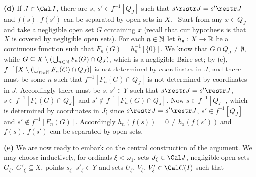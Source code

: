 {{\bf (d)} If $J\in\Cal J$, there are $s$, $s'\in f^{-1}[Q_J]$ such that
$s\restr J=s'\restr J$ and $f(s)$, $f(s')$ can be separated by open sets
in $X$.   \Prf\ Start from any $x\in Q_J$ and take a negligible
open set $G$ containing $x$ (recall that our hypothesis is that $X$ is
covered by negligible open sets).   For each $n\in\Bbb N$ let
$h_n:X\to\Bbb R$ be a continuous function such that
$F_n(G)=h_n^{-1}[\{0\}]$.   We know that $G\cap Q_J\ne\emptyset$, while
$G\subseteq X\setminus(\bigcup_{n\in\Bbb N}F_n(G)\cap Q_J)$, which is a
negligible Baire set;  by (c), $f^{-1}[X\setminus(\bigcup_{n\in\Bbb
N}F_n(G)\cap Q_J)]$ is not determined by coordinates in $J$, and there
must be some $n$ such that $f^{-1}[F_n(G)\cap Q_J]$ is not determined by
coordinates in $J$.   Accordingly
there must be $s$, $s'\in Y$ such that $s\restr J=s'\restr J$, $s\in
f^{-1}[F_n(G)\cap Q_J]$ and $s'\notin f^{-1}[F_n(G)\cap Q_J]$.   Now
$s\in f^{-1}[Q_J]$, which is determined by coordinates in $J$;  since
$s\restr J=s'\restr J$, $s'\in f^{-1}[Q_J]$ and
$s'\notin f^{-1}[F_n(G)]$.
Accordingly $h_n(f(s))=0\ne h_n(f(s'))$ and $f(s)$, $f(s')$ can be
separated by open sets.\ \Qed

\medskip

{\bf (e)} We are now ready to embark on the central construction of the
argument.   We may choose inductively, for ordinals $\xi<\omega_1$, sets
$J_{\xi}\in\Cal J$, negligible open sets $G_{\xi}$, 
$G'_{\xi}\subseteq X$, points $s_{\xi}$, $s'_{\xi}\in Y$ and sets 
$U_{\xi}$, $V_{\xi}$, $V'_{\xi}\in\Cal C(I)$ such that





}
